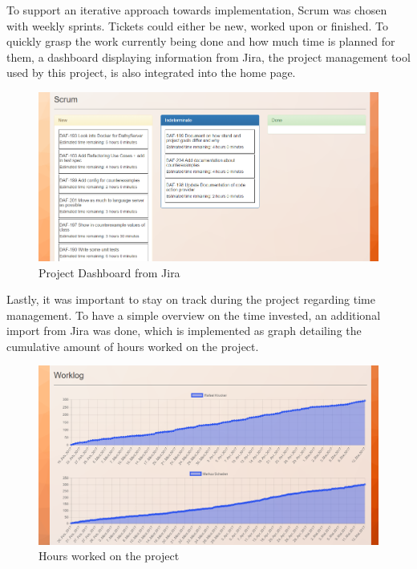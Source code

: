 To support an iterative approach towards implementation, Scrum was chosen with weekly sprints. Tickets could either be new, worked upon or finished. To quickly grasp the work currently being done and how much time is planned for them, a dashboard displaying information from Jira, the project management tool used by this project, is also integrated into the home page.\newline
\begin{figure}[H]
	\centering
	\includegraphics[width=1\textwidth]{img/homeScrum}
	\caption{Project Dashboard from Jira}
	\label{fig:Jira}
\end{figure}

Lastly, it was important to stay on track during the project regarding time management. To have a simple overview on the time invested, an additional import from Jira was done, which is implemented as graph detailing the cumulative amount of hours worked on the project. \newline
\begin{figure}[H]
	\centering
	\includegraphics[width=1\textwidth]{img/homeTime}
	\caption{Hours worked on the project}
	\label{fig:Jira Hours}
\end{figure}

